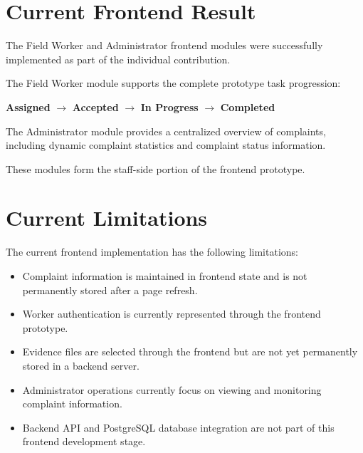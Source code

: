 \documentclass[12pt,a4paper]{article}
\begin{document}
\section{Current Frontend Result}

The Field Worker and Administrator frontend modules were successfully
implemented as part of the individual contribution.

The Field Worker module supports the complete prototype task progression:

\begin{center}
\textbf{Assigned}
$\rightarrow$
\textbf{Accepted}
$\rightarrow$
\textbf{In Progress}
$\rightarrow$
\textbf{Completed}
\end{center}

The Administrator module provides a centralized overview of complaints,
including dynamic complaint statistics and complaint status information.

These modules form the staff-side portion of the frontend prototype.

\section{Current Limitations}

The current frontend implementation has the following limitations:

\begin{itemize}
    \item Complaint information is maintained in frontend state and is not
    permanently stored after a page refresh.
    
    \item Worker authentication is currently represented through the
    frontend prototype.
    
    \item Evidence files are selected through the frontend but are not yet
    permanently stored in a backend server.
    
    \item Administrator operations currently focus on viewing and monitoring
    complaint information.
    
    \item Backend API and PostgreSQL database integration are not part of
    this frontend development stage.
\end{itemize}
\end{document}
